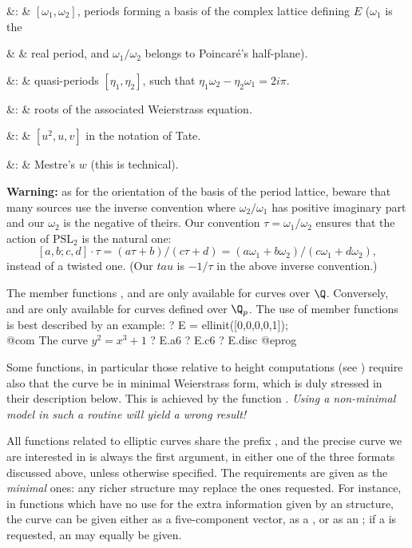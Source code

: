 \+ &: & $[\omega_1,\omega_2]$, periods forming a basis of
the complex lattice defining $E$ ($\omega_1$ is the\cr

\+            &   & real period, and $\omega_1/\omega_2$ belongs to
Poincar\'e's half-plane).\cr

\+   &: & quasi-periods $[\eta_1, \eta_2]$, such that
$\eta_1\omega_2-\eta_2\omega_1=2i\pi$.\cr

\+ &: & roots of the associated Weierstrass equation.\cr

\+  &: & $[u^2,u,v]$ in the notation of Tate.\cr

\+  &: & Mestre's $w$ (this is technical).\cr

\noindent
{\bf Warning:} as for the orientation of the basis of the period lattice,
beware that many sources use the inverse convention where $\omega_2/\omega_1$
has positive imaginary part and our $\omega_2$ is the negative of theirs. Our
convention $\tau = \omega_1/\omega_2$  ensures that the action of $\text{PSL}_2$ is the natural
one:
$$[a,b;c,d]\cdot\tau = (a\tau+b)/(c\tau+d)
  = (a \omega_1 + b\omega_2)/(c\omega_1 + d\omega_2),$$
instead of a twisted one. (Our $tau$ is $-1/\tau$ in the above inverse
convention.)

The member functions ,  and  are only available
for curves over $\Q$. Conversely,  and  are only available
for curves defined over $\Q_p$. The use of member functions is best described
by an example:
\bprog
  ? E = ellinit([0,0,0,0,1]); \\@com The curve $y^2 = x^3 + 1$
  ? E.a6
  ? E.c6
  ? E.disc
@eprog
\smallskip

Some functions, in particular those relative to height computations (see
) require also that the curve be in minimal Weierstrass
form, which is duly stressed in their description below. This is achieved by
the function . \emph{Using a non-minimal model in such a
routine will yield a wrong result!}

All functions related to elliptic curves share the prefix , and the
precise curve we are interested in is always the first argument, in either
one of the three formats discussed above, unless otherwise specified. The
requirements are given as the \emph{minimal} ones: any richer structure may
replace the ones requested. For instance, in functions which have no use for
the extra information given by an  structure, the curve can be given
either as a five-component vector, as a , or as an ;
if a  is requested, an  may equally be given.


